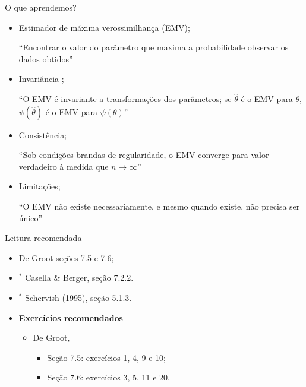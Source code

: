 \begin{frame}{O que aprendemos?}
\begin{itemize}
 \item[\faLightbulbO] Estimador de máxima verossimilhança (EMV);
 
   ``Encontrar o valor do parâmetro que maxima a probabilidade observar os dados obtidos''
   
  \item[\faLightbulbO] Invariância ;
  
  ``O EMV é invariante a transformações dos parâmetros; se $\hat{\theta}$ é o EMV para $\theta$, $\psi(\hat{\theta})$ é o EMV para $\psi(\theta)$''
  
    \item[\faLightbulbO] Consistência;
  
  ``Sob condições brandas de regularidade, o EMV converge para valor verdadeiro à medida que $n \to \infty$''
  
    \item[\faLightbulbO] Limitações;
  
  ``O EMV não existe necessariamente, e mesmo quando existe, não precisa ser único''
  
  \end{itemize}
 \end{frame}

\begin{frame}{Leitura recomendada}
\begin{itemize}
 \item[\faBook] De Groot seções 7.5 e 7.6;
 \item[\faBook] $^\ast$ Casella \& Berger, seção 7.2.2.
 \item[\faBook] $^\ast$ Schervish (1995), seção 5.1.3.
 \item {\large\textbf{Exercícios recomendados}}
 \begin{itemize}
  \item[\faBookmark] De Groot,
  \begin{itemize}
   \item Seção 7.5: exercícios  1, 4, 9 e 10;
   \item Seção 7.6: exercícios 3, 5, 11 e 20.
  \end{itemize}   
  \end{itemize}
 \end{itemize} 
\end{frame}

